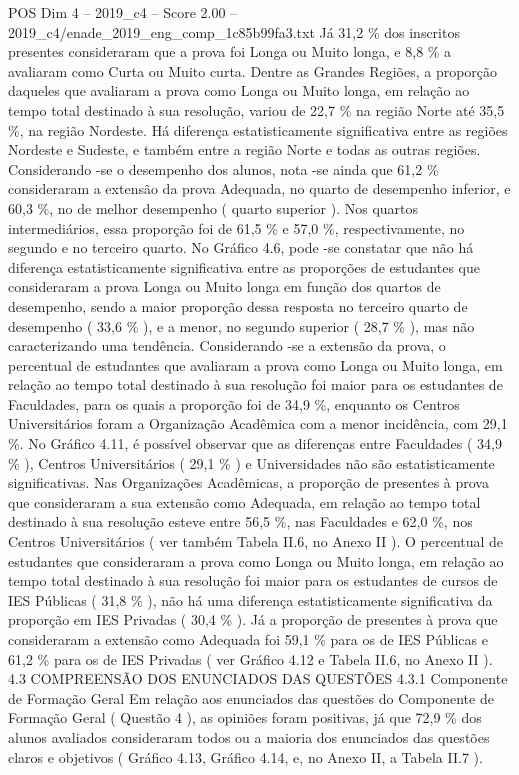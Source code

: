 \begin{textsample}{POS Dim 4 – 2019\_c4 – Score 2.00 – 2019\_c4/enade\_2019\_eng\_comp\_1c85b99fa3.txt}
Já 31,2 \% dos inscritos presentes consideraram que a prova foi Longa ou Muito longa, e 8,8 \% a avaliaram como Curta ou Muito curta.
Dentre as Grandes Regiões, a proporção daqueles que avaliaram a prova como Longa ou Muito longa, em relação ao tempo total destinado à sua resolução, variou de 22,7 \% na região Norte até 35,5 \%, na região Nordeste.
Há diferença estatisticamente significativa entre as regiões Nordeste e Sudeste, e também entre a região Norte e todas as outras regiões.
Considerando -se o desempenho dos alunos, nota -se ainda que 61,2 \% consideraram a extensão da prova Adequada, no quarto de desempenho inferior, e 60,3 \%, no de melhor desempenho ( quarto superior ).
Nos quartos intermediários, essa proporção foi de 61,5 \% e 57,0 \%, respectivamente, no segundo e no terceiro quarto.
No Gráfico 4.6, pode -se constatar que não há diferença estatisticamente significativa entre as proporções de estudantes que consideraram a prova Longa ou Muito longa em função dos quartos de desempenho, sendo a maior proporção dessa resposta no terceiro quarto de desempenho ( 33,6 \% ), e a menor, no segundo superior ( 28,7 \% ), mas não caracterizando uma tendência.
Considerando -se a extensão da prova, o percentual de estudantes que avaliaram a prova como Longa ou Muito longa, em relação ao tempo total destinado à sua resolução foi maior para os estudantes de Faculdades, para os quais a proporção foi de 34,9 \%, enquanto os Centros Universitários foram a Organização Acadêmica com a menor incidência, com 29,1 \%.
No Gráfico 4.11, é possível observar que as diferenças entre Faculdades ( 34,9 \% ), Centros Universitários ( 29,1 \% ) e Universidades não são estatisticamente significativas.
Nas Organizações Acadêmicas, a proporção de presentes à prova que consideraram a sua extensão como Adequada, em relação ao tempo total destinado à sua resolução esteve entre 56,5 \%, nas Faculdades e 62,0 \%, nos Centros Universitários ( ver também Tabela II.6, no Anexo II ).
O percentual de estudantes que consideraram a prova como Longa ou Muito longa, em relação ao tempo total destinado à sua resolução foi maior para os estudantes de cursos de IES Públicas ( 31,8 \% ), não há uma diferença estatisticamente significativa da proporção em IES Privadas ( 30,4 \% ).
Já a proporção de presentes à prova que consideraram a extensão como Adequada foi 59,1 \% para os de IES Públicas e 61,2 \% para os de IES Privadas ( ver Gráfico 4.12 e Tabela II.6, no Anexo II ). 4.3 COMPREENSÃO DOS ENUNCIADOS DAS QUESTÕES 4.3.1 Componente de Formação Geral Em relação aos enunciados das questões do Componente de Formação Geral ( Questão 4 ), as opiniões foram positivas, já que 72,9 \% dos alunos avaliados consideraram todos ou a maioria dos enunciados das questões claros e objetivos ( Gráfico 4.13, Gráfico 4.14, e, no Anexo II, a Tabela II.7 ).

\end{textsample}
